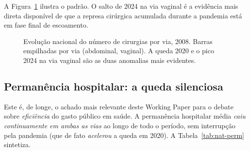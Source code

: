 \documentclass[12pt,a4paper,oneside]{article}
\begin{document}
A Figura~\ref{fig:evolucao-vol} ilustra o padrão. O salto de
2024 na via vaginal é a evidência mais direta
disponível de que a represa cirúrgica acumulada durante a pandemia
está em fase final de escoamento.

\begin{figure}[H]
\centering
{}
\caption{Evolução nacional do número de cirurgias por via,
2008. Barras empilhadas por via (abdominal, vaginal).
A queda 2020 e o pico 2024 na via
vaginal são as duas anomalias mais evidentes.}
\label{fig:evolucao-vol}
\end{figure}

\subsection{Permanência hospitalar: a queda silenciosa}\label{sub:permanencia}

Este é, de longe, o achado mais relevante deste Working Paper para
o debate sobre \textit{eficiência} do gasto público em saúde. A
permanência hospitalar média \textit{caiu continuamente em ambas
as vias} ao longo de todo o período, sem interrupção pela pandemia
(que de fato \textit{acelerou} a queda em 2020).
A Tabela~\ref{tab:nat-perm} sintetiza.
\end{document}
